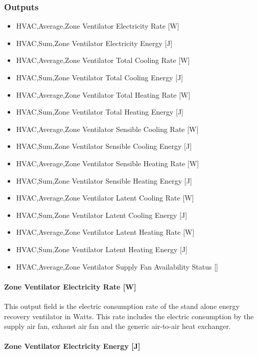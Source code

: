 \subsubsection{Outputs}\label{outputs-11-006}

\begin{itemize}
\item
  HVAC,Average,Zone Ventilator Electricity Rate {[}W{]}
\item
  HVAC,Sum,Zone Ventilator Electricity Energy {[}J{]}
\item
  HVAC,Average,Zone Ventilator Total Cooling Rate {[}W{]}
\item
  HVAC,Sum,Zone Ventilator Total Cooling Energy {[}J{]}
\item
  HVAC,Average,Zone Ventilator Total Heating Rate {[}W{]}
\item
  HVAC,Sum,Zone Ventilator Total Heating Energy {[}J{]}
\item
  HVAC,Average,Zone Ventilator Sensible Cooling Rate {[}W{]}
\item
  HVAC,Sum,Zone Ventilator Sensible Cooling Energy {[}J{]}
\item
  HVAC,Average,Zone Ventilator Sensible Heating Rate {[}W{]}
\item
  HVAC,Sum,Zone Ventilator Sensible Heating Energy {[}J{]}
\item
  HVAC,Average,Zone Ventilator Latent Cooling Rate {[}W{]}
\item
  HVAC,Sum,Zone Ventilator Latent Cooling Energy {[}J{]}
\item
  HVAC,Average,Zone Ventilator Latent Heating Rate {[}W{]}
\item
  HVAC,Sum,Zone Ventilator Latent Heating Energy {[}J{]}
\item
  HVAC,Average,Zone Ventilator Supply Fan Availability Status {[]}
\end{itemize}

\paragraph{Zone Ventilator Electricity Rate {[}W{]}}\label{zone-ventilator-electric-power-w}

This output field is the electric consumption rate of the stand alone energy recovery ventilator in Watts. This rate includes the electric consumption by the supply air fan, exhaust air fan and the generic air-to-air heat exchanger.

\paragraph{Zone Ventilator Electricity Energy {[}J{]}}\label{zone-ventilator-electric-energy-j}

